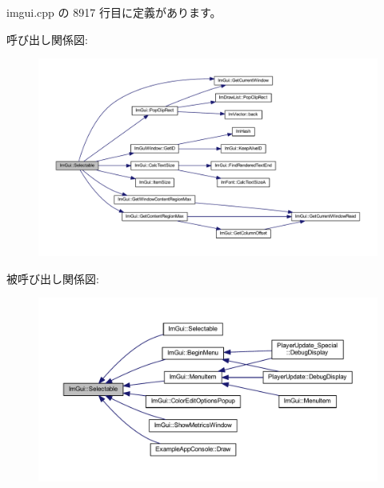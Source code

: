  imgui.\+cpp の 8917 行目に定義があります。

呼び出し関係図\+:\nopagebreak
\begin{figure}[H]
\begin{center}
\leavevmode
\includegraphics[width=350pt]{namespace_im_gui_af98575238bda183a523df19fb447af60_cgraph}
\end{center}
\end{figure}
被呼び出し関係図\+:\nopagebreak
\begin{figure}[H]
\begin{center}
\leavevmode
\includegraphics[width=350pt]{namespace_im_gui_af98575238bda183a523df19fb447af60_icgraph}
\end{center}
\end{figure}
\mbox{\label{namespace_im_gui_a9229a9c3c304ffc0c98ffe2ee4ff5e40}} 
